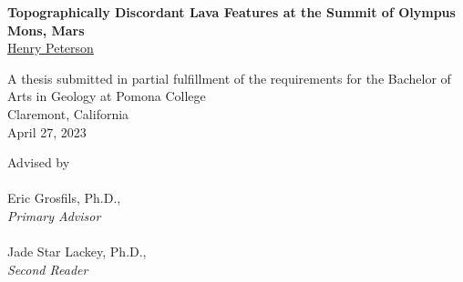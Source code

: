 \renewcommand{\headrulewidth}{0pt} %
\begin{titlepage}
    \begin{center}

        \phantom{.}
        \vfill
        \vfill
        \large\textbf{Topographically Discordant Lava Features at the Summit of Olympus Mons, Mars}
        \\
        \href{mailto:hgpa2018@mymail.pomona.edu}{Henry Peterson}

        \vfill
        \vfill

        A thesis submitted in partial fulfillment of the requirements for the Bachelor of Arts in Geology at Pomona College\\
        Claremont, California\\
        April 27, 2023

        \vfill
        \phantom{.}

        \newpage

        \phantom{.}
        \vfill
        Advised by
        \\~\\
        Eric Grosfils, Ph.D.,\\
        \emph{Primary Advisor}
        \\~\\
        Jade Star Lackey, Ph.D.,\\
        \emph{Second Reader}
        \vfill
        \phantom{.}

    \end{center}
\end{titlepage}

\renewcommand{\headrulewidth}{0.5pt}
